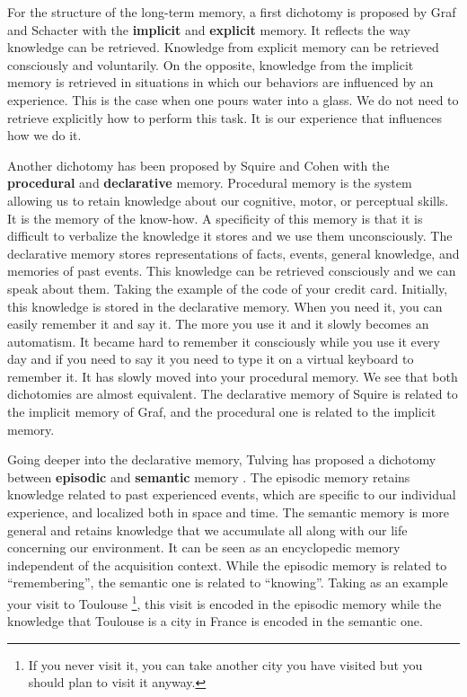 For the structure of the long-term memory, a first dichotomy is proposed by Graf and Schacter \cite{graf_1985_implicit} with the \textbf{implicit} and \textbf{explicit} memory. It reflects the way knowledge can be retrieved. Knowledge from explicit memory can be retrieved consciously and voluntarily. On the opposite, knowledge from the implicit memory is retrieved in situations in which our behaviors are influenced by an experience. This is the case when one pours water into a glass. We do not need to retrieve explicitly how to perform this task. It is our experience that influences how we do it.

Another dichotomy has been proposed by Squire and Cohen \cite{squire_1982_remote} with the \textbf{procedural} and \textbf{declarative} memory. Procedural memory is the system allowing us to retain knowledge about our cognitive, motor, or perceptual skills. It is the memory of the know-how. A specificity of this memory is that it is difficult to verbalize the knowledge it stores and we use them unconsciously. The declarative memory stores representations of facts, events, general knowledge, and memories of past events. This knowledge can be retrieved consciously and we can speak about them. Taking the example of the code of your credit card. Initially, this knowledge is stored in the declarative memory. When you need it, you can easily remember it and say it. The more you use it and it slowly becomes an automatism. It became hard to remember it consciously while you use it every day and if you need to say it you need to type it on a virtual keyboard to remember it. It has slowly moved into your procedural memory. We see that both dichotomies are almost equivalent. The declarative memory of Squire is related to the implicit memory of Graf, and the procedural one is related to the implicit memory.

Going deeper into the declarative memory, Tulving has proposed a dichotomy between \textbf{episodic} and \textbf{semantic} memory \cite{tulving_1995_organization}. The episodic memory retains knowledge related to past experienced events, which are specific to our individual experience, and localized both in space and time. The semantic memory is more general and retains knowledge that we accumulate all along with our life concerning our environment. It can be seen as an encyclopedic memory independent of the acquisition context. While the episodic memory is related to ``remembering'', the semantic one is related to ``knowing''. Taking as an example your visit to Toulouse \footnote{If you never visit it, you can take another city you have visited but you should plan to visit it anyway.}, this visit is encoded in the episodic memory while the knowledge that Toulouse is a city in France is encoded in the semantic one.

